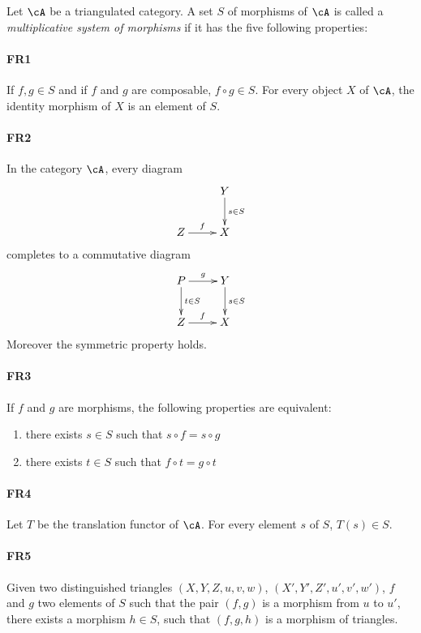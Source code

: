 \begin{definition}
Let $\cA$ be a triangulated category. A set $S$ of morphisms of $\cA$
is called a \emph{multiplicative system of morphisms} if it has the
five following properties: 

\paragraph{FR1}
\hypertarget{VIII:FR1}{}
If $f,g\in S$ and if $f$ and $g$ are composable, $f\circ g\in S$. For every
object $X$ of $\cA$, the identity morphism of $X$ is an element of $S$. 

\paragraph{FR2}
\hypertarget{VIII:FR2}{}
In the category $\cA$, every diagram 
\[\xymatrix{
  & Y \ar[d]^-{s\in S} \\
  Z \ar[r]^-f 
    & X 
}\]
completes to a commutative diagram 
\[\xymatrix{
  P \ar[r]^-g \ar[d]^-{t\in S} 
    & Y \ar[d]^-{s\in S} \\
  Z \ar[r]^-f 
    & X 
}\]
Moreover the symmetric property holds. 

\paragraph{FR3}
\hypertarget{VIII:FR3}{}
If $f$ and $g$ are morphisms, the following properties are
equivalent:
\begin{enumerate}[\indent i)]
  \item there exists $s\in S$ such that $s\circ f=s\circ g$
  \item there exists $t\in S$ such that $f\circ t=g\circ t$
\end{enumerate}

\paragraph{FR4}
\hypertarget{VIII:FR4}{}
Let $T$ be the translation functor of $\cA$. For every element $s$ of $S$,
$T(s)\in S$. 

\paragraph{FR5}
\hypertarget{VIII:FR5}{}
Given two distinguished triangles $(X,Y,Z,u,v,w)$, $(X',Y',Z',u',v',w')$,
$f$ and $g$ two elements of $S$ such that the pair $(f,g)$ is a
morphism from $u$ to $u'$, there exists a morphism $h\in S$, such that
$(f,g,h)$ is a morphism of triangles. 
\end{definition}

